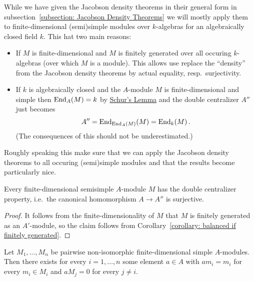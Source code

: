 \begin{fluff}
  While we have given the Jacobson density theorems in their general form in subsection~\ref{subsection: Jacobson Density Theorems} we will mostly apply them to finite-dimensional (semi)simple modules over $k$-algebras for an algebraically closed field $k$.
  This hat two main reasons:
  \begin{itemize}
    \item
      If $M$ is finite-dimensional and $M$ is finitely generated over all occuring $k$-algebras (over which $M$ is a module).
      This allows use replace the \enquote{density} from the Jacobson density theorems by actual equality, resp.\ surjectivity.
    \item
      If $k$ is algebraically closed and the $A$-module $M$ is finite-dimensional and simple then $\operatorname{End}_A(M) = k$ by \hyperref[proposition: schurs lemma for modules]{Schur’s Lemma} and the double centralizer $A''$ just becomes
      \[
          A''
        = \operatorname{End}_{\operatorname{End}_A(M)}(M)
        = \operatorname{End}_k(M) \,.
      \]
      (The consequences of this should not be underestimated.)
  \end{itemize}
  Roughly speaking this make sure that we can apply the Jacobson density theorems to all occuring (semi)simple modules and that the results become particularly nice.
\end{fluff}


\begin{lemma}
  \label{lemma: fd balanced are ss}
  Every finite-dimensional semisimple $A$-module $M$ has the double centralizer property, i.e.\ the canonical homomorphism $A \to A''$ is surjective.
\end{lemma}


\begin{proof}
  It follows from the finite-dimensionality of $M$ that $M$ is finitely generated as an $A'$-module, so the claim follows from Corollary~\ref{corollary: balanced if finitely generated}.
\end{proof}


\begin{corollary}
  \label{corollary: existence of projection operators}
  Let $M_1, \dotsc, M_n$ be pairwise non-isomorphic finite-dimensional simple $A$-modules.
  Then there exists for every $i = 1, \dotsc, n$ some element $a \in A$ with $a m_i = m_i$ for every $m_i \in M_i$ and $a M_j = 0$ for every $j \neq i$.
\end{corollary}



